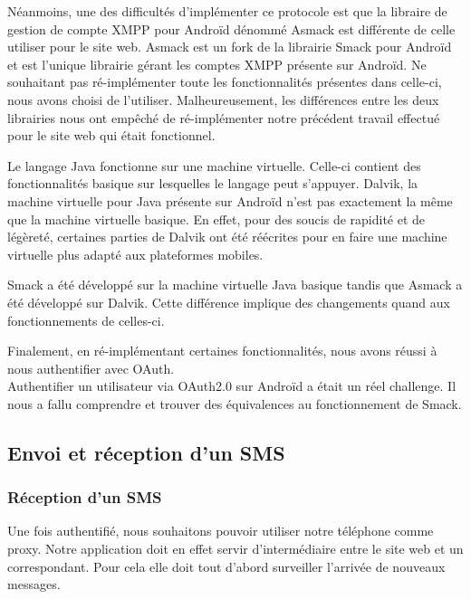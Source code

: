 Néanmoins, une des difficultés d'implémenter ce protocole est que la libraire de gestion de compte
XMPP pour Androïd dénommé Asmack est différente de celle utiliser pour le site web. Asmack est un fork 
de la librairie Smack pour Androïd et est l'unique librairie gérant les comptes XMPP présente sur
Androïd. Ne souhaitant pas ré-implémenter toute les fonctionnalités présentes dans celle-ci, nous avons
choisi de l'utiliser. Malheureusement, les différences entre les deux librairies nous ont empêché de 
ré-implémenter notre précédent travail effectué pour le site web qui était fonctionnel. 

Le langage Java fonctionne sur une machine virtuelle. Celle-ci contient des fonctionnalités basique sur
lesquelles le langage peut s'appuyer. Dalvik, la machine virtuelle pour Java présente sur Androïd n'est 
pas exactement la même que la machine virtuelle basique. En effet, pour des soucis de rapidité et de 
légèreté, certaines parties de Dalvik ont été réécrites pour en faire une machine virtuelle plus adapté
aux plateformes mobiles.

Smack a été développé sur la machine virtuelle Java basique tandis que Asmack a été développé sur Dalvik.
Cette différence implique des changements quand aux fonctionnements de celles-ci. 

Finalement, en ré-implémentant certaines fonctionnalités, nous avons réussi à nous authentifier avec OAuth.
\\


Authentifier un utilisateur via OAuth2.0 sur Androïd a était un réel challenge. Il nous a fallu comprendre 
et trouver des équivalences au fonctionnement de Smack. 
\\



\subsection{Envoi et réception d'un SMS}

\subsubsection{Réception d'un SMS}

Une fois authentifié, nous souhaitons pouvoir utiliser notre téléphone comme proxy. Notre application
doit en effet servir d'intermédiaire entre le site web et un correspondant. Pour cela elle doit tout
d'abord surveiller l'arrivée de nouveaux messages. 

